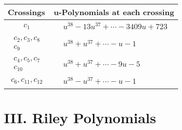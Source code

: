 \documentclass[1p]{elsarticle_modified}
\theoremstyle{definition}
\begin{document}
\begin{tabular}{m{50pt}|m{274pt}}
Crossings & \hspace{64pt}u-Polynomials at each crossing \\
\hline $$\begin{aligned}c_{1}\end{aligned}$$&$\begin{aligned}
&u^{38}-13 u^{37}+\cdots-3409 u+723
\end{aligned}$\\
\hline $$\begin{aligned}c_{2},c_{3},c_{8}\\c_{9}\end{aligned}$$&$\begin{aligned}
&u^{38}+u^{37}+\cdots- u-1
\end{aligned}$\\
\hline $$\begin{aligned}c_{4},c_{5},c_{7}\\c_{10}\end{aligned}$$&$\begin{aligned}
&u^{38}+u^{37}+\cdots-9 u-5
\end{aligned}$\\
\hline $$\begin{aligned}c_{6},c_{11},c_{12}\end{aligned}$$&$\begin{aligned}
&u^{38}- u^{37}+\cdots- u-1
\end{aligned}$\\
\hline
\end{tabular}\newpage\renewcommand{\arraystretch}{1}
\centering \section*{ III. Riley Polynomials}
\end{document}
